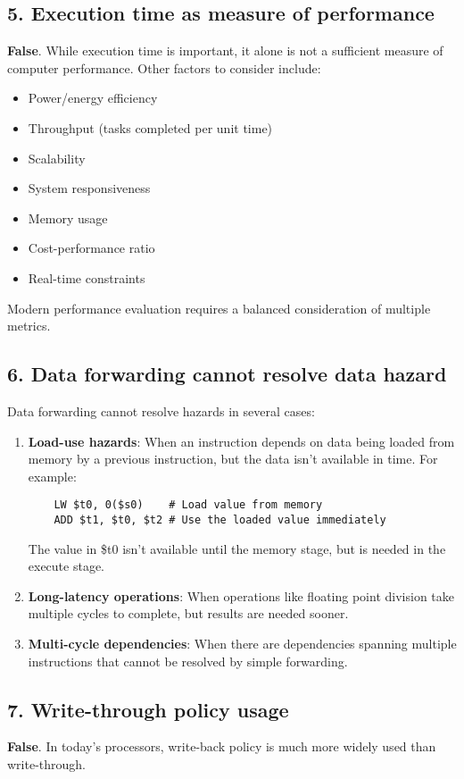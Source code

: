 \documentclass[12pt]{article}
\begin{document}
\subsection*{5. Execution time as measure of performance}
\textbf{False}. While execution time is important, it alone is not a sufficient measure of computer performance. Other factors to consider include:
\begin{itemize}
    \item Power/energy efficiency
    \item Throughput (tasks completed per unit time)
    \item Scalability
    \item System responsiveness
    \item Memory usage
    \item Cost-performance ratio
    \item Real-time constraints
\end{itemize}

Modern performance evaluation requires a balanced consideration of multiple metrics.

\subsection*{6. Data forwarding cannot resolve data hazard}
Data forwarding cannot resolve hazards in several cases:
\begin{enumerate}
    \item \textbf{Load-use hazards}: When an instruction depends on data being loaded from memory by a previous instruction, but the data isn't available in time. For example:
    \begin{verbatim}
    LW $t0, 0($s0)    # Load value from memory
    ADD $t1, $t0, $t2 # Use the loaded value immediately
    \end{verbatim}
    The value in \$t0 isn't available until the memory stage, but is needed in the execute stage.
    
    \item \textbf{Long-latency operations}: When operations like floating point division take multiple cycles to complete, but results are needed sooner.
    
    \item \textbf{Multi-cycle dependencies}: When there are dependencies spanning multiple instructions that cannot be resolved by simple forwarding.
\end{enumerate}

\subsection*{7. Write-through policy usage}
\textbf{False}. In today's processors, write-back policy is much more widely used than write-through. 
\end{document}
